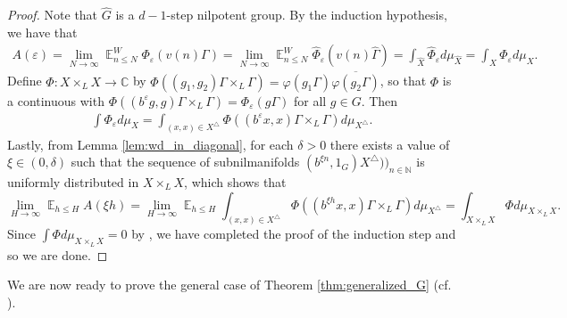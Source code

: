 \documentclass[12pt]{article}
\theoremstyle{plain} %
\theoremstyle{definition} %
\theoremstyle{plain}
\theoremstyle{plain}
\numberwithin{equation}{section}
\newcommand{\N}{\mathbb{N}}
\newcommand{\C}{\mathbb{C}}
\renewcommand{\epsilon}{\varepsilon}
\renewcommand{\leq}{\leqslant}
\newcommand{\1}{\mathbbm{1}}
\newcommand{\E}{\operatorname{\mathbb{E}}}
\newcommand{\oo}{\infty}
\begin{document}
\begin{proof}
Note that $\widehat{G}$ is a $d-1$-step nilpotent group. By the induction hypothesis, we have that 
\begin{align*}
    A(\epsilon)  = \lim_{N\to\oo}\E_{n\leq N}^W\Phi_{\epsilon}(v(n)\Gamma) = \lim_{N\to\oo}\E_{n\leq N}^W\widehat{\Phi}_{\epsilon}(v(n)\widehat{\Gamma})= \int_{\widehat{X}}\widehat{\Phi}_{\epsilon}d\mu_{\widehat{X}} = \int_X{\Phi}_{\epsilon}d\mu_{{X}}.
\end{align*}
Define $\Phi:X\times_L X\rightarrow \C$ by $\Phi((g_1,g_2)\Gamma\times_L\Gamma) =\varphi(g_1\Gamma)\overline{\varphi(g_2\Gamma)}$, so that $\Phi$ is a continuous with $\Phi((b^{\epsilon}g,g)\Gamma\times_L\Gamma) = \Phi_{\epsilon}(g\Gamma )$ for all $g\in G$. Then
\begin{align*}
\int \Phi_{\epsilon}d\mu_{{X}} = \int_{(x,x)\in X^{\triangle}} \Phi((b^{\epsilon}x,x)\Gamma\times_L\Gamma)d\mu_{{X^{\triangle}}}.
\end{align*}
Lastly, from Lemma \ref{lem:wd_in_diagonal}, for each $\delta>0$ there exists a value of $\xi\in (0,\delta)$ such that the sequence of subnilmanifolds $(b^{\xi n}, 1_G)X^{\triangle}))_{n\in \N}$ is uniformly distributed in $X\times_L X$, which shows that
\begin{equation}
    \lim_{H\to\oo}\E_{h\leq H}A(\xi h) = \lim_{H\to\oo}\E_{h\leq H} \int_{(x,x)\in X^{\triangle}} \Phi((b^{\xi h}x,x)\Gamma\times_L\Gamma)d\mu_{{X^{\triangle}}} = \int_{X\times_L X}\Phi d\mu_{X\times_L X}.
\end{equation}
Since $\int\Phi d\mu_{X\times_L X}=0$ by \cite[Claim 1 p. 449]{Richter23}, we have completed the proof of the induction step and so we are done.
 \end{proof}
We are now ready to prove the general case of Theorem \ref{thm:generalized_G} (cf. {\cite[Section 4.3]{Richter23}}).
\end{document}
